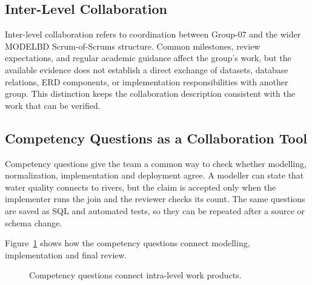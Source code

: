 \subsection{Inter-Level Collaboration}
\label{subsec:inter-level-collaboration}

Inter-level collaboration refers to coordination between Group-07 and the
wider MODELBD Scrum-of-Scrums structure. Common milestones, review
expectations, and regular academic guidance affect the group's work, but the
available evidence does not establish a direct exchange of datasets, database
relations, ERD components, or implementation responsibilities with another
group. This distinction keeps the collaboration description consistent with
the work that can be verified.

\subsection{Competency Questions as a Collaboration Tool}
\label{subsec:competency-collaboration}

Competency questions give the team a common way to check whether modelling,
normalization, implementation and deployment agree. A modeller can state that water
quality connects to rivers, but the claim is accepted only when the implementer
runs the join and the reviewer checks its count. The same questions are saved
as SQL and automated tests, so they can be repeated after a source or schema
change.

Figure~\ref{fig:competency-collaboration} shows how the competency questions
connect modelling, implementation and final review.

\begin{figure}[H]
\centering
{}
\caption{Competency questions connect intra-level work products.}
\label{fig:competency-collaboration}
\end{figure}
